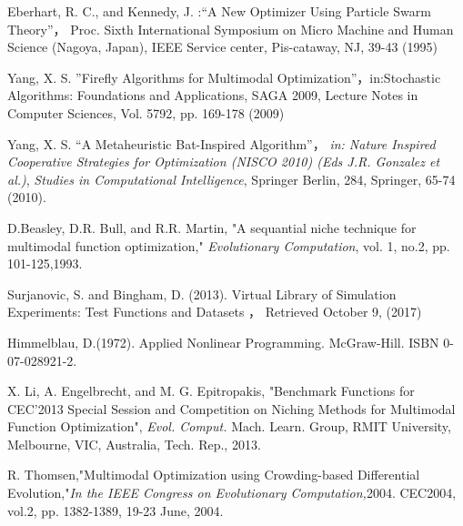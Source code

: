 \documentclass{jarticle}
\begin{document}
\small
\begin{thebibliography}{10}


Eberhart, R. C., and Kennedy, J. :“A New Optimizer Using Particle Swarm Theory”，
Proc. Sixth International Symposium on Micro Machine and Human Science (Nagoya, Japan), IEEE Service center, Pis-cataway, NJ, 39-43 (1995)

Yang, X. S. ”Firefly Algorithms for Multimodal Optimization”，in:Stochastic Algorithms: Foundations and Applications, SAGA 2009, Lecture Notes in Computer Sciences, Vol. 5792, pp. 169-178 (2009)

 Yang, X. S. “A Metaheuristic Bat-Inspired Algorithm”， {\it in: Nature Inspired Cooperative Strategies for Optimization (NISCO 2010) (Eds J.R. Gonzalez et al.)}, {\it Studies in Computational Intelligence}, Springer Berlin, 284, Springer, 65-74 (2010).

 D.Beasley, D.R. Bull, and R.R. Martin, "A sequantial niche technique for multimodal function optimization," {\it Evolutionary Computation}, vol. 1, no.2, pp. 101-125,1993.

  Surjanovic, S. and Bingham, D. (2013). Virtual Library of Simulation Experiments: Test Functions and Datasets ， Retrieved October 9, (2017)

 Himmelblau, D.(1972). Applied Nonlinear Programming. McGraw-Hill. ISBN 0-07-028921-2.

 X. Li, A. Engelbrecht, and M. G. Epitropakis, "Benchmark Functions for CEC'2013 Special Session and Competition on Niching Methods for Multimodal Function Optimization", {\it Evol. Comput.} Mach. Learn. Group, RMIT University, Melbourne, VIC, Australia, Tech. Rep., 2013.

 R. Thomsen,"Multimodal Optimization using Crowding-based Differential Evolution,"{\it In the IEEE Congress on Evolutionary Computation,}2004. CEC2004, vol.2, pp. 1382-1389, 19-23 June, 2004.

\end{thebibliography}
\normalsize
\end{document}
